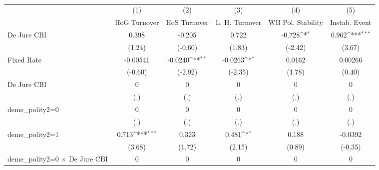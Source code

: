 \begin{table}[htbp]\centering
\def\sym#1{\ifmmode^{#1}\else\(^{#1}\)\fi}
\caption{\label{binarydemcmultIndFEDJ}}
\begin{tabular}{l*{5}{c}}
\toprule
                                        &\multicolumn{1}{c}{(1)}&\multicolumn{1}{c}{(2)}&\multicolumn{1}{c}{(3)}&\multicolumn{1}{c}{(4)}&\multicolumn{1}{c}{(5)}\\
                                        &\multicolumn{1}{c}{HoG Turnover}&\multicolumn{1}{c}{HoS Turnover}&\multicolumn{1}{c}{L. H. Turnover}&\multicolumn{1}{c}{WB Pol. Stability}&\multicolumn{1}{c}{Instab. Event}\\
\midrule
De Jure CBI                             &    0.398         &   -0.205         &    0.722         &   -0.728\sym{*}  &    0.962\sym{***}\\
                                        &   (1.24)         &  (-0.60)         &   (1.83)         &  (-2.42)         &   (3.67)         \\
\addlinespace
Fixed Rate                              & -0.00541         &  -0.0240\sym{**} &  -0.0263\sym{*}  &   0.0162         &  0.00266         \\
                                        &  (-0.60)         &  (-2.92)         &  (-2.35)         &   (1.78)         &   (0.40)         \\
\addlinespace
De Jure CBI                             &        0         &        0         &        0         &        0         &        0         \\
                                        &      (.)         &      (.)         &      (.)         &      (.)         &      (.)         \\
\addlinespace
deme\_polity2=0                          &        0         &        0         &        0         &        0         &        0         \\
                                        &      (.)         &      (.)         &      (.)         &      (.)         &      (.)         \\
\addlinespace
deme\_polity2=1                          &    0.713\sym{***}&    0.323         &    0.481\sym{*}  &    0.188         &  -0.0392         \\
                                        &   (3.68)         &   (1.72)         &   (2.15)         &   (0.89)         &  (-0.35)         \\
\addlinespace
deme\_polity2=0 $\times$ De Jure CBI     &        0         &        0         &        0         &        0         &        0         \\

\end{tabular}
\end{table}
